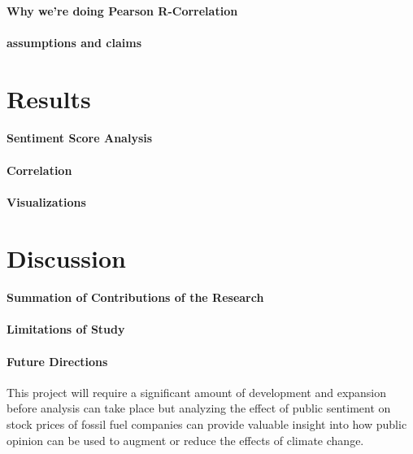 \documentclass[12pt]{article}
\begin{document}
\paragraph{Why we're doing Pearson R-Correlation}

\paragraph{assumptions and claims}

\section{Results}
\paragraph{Sentiment Score Analysis}
\paragraph{Correlation}
\paragraph{Visualizations}

\section{Discussion}
\paragraph{Summation of Contributions of the Research}
\paragraph{Limitations of Study}
\paragraph{Future Directions}
This project will require a significant amount of development and expansion before analysis can take place but analyzing the effect of public sentiment on stock prices of fossil fuel companies can provide valuable insight into how public opinion can be used to augment or reduce the effects of climate change.


%
%
\end{document}
